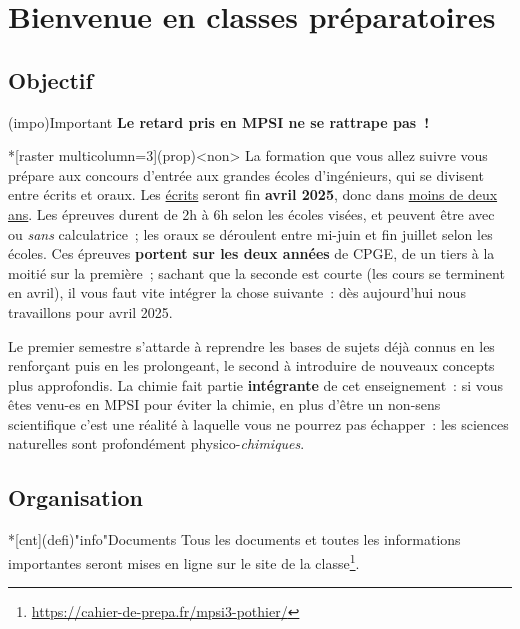 \documentclass[10pt, garamond]{book}
\begin{document}
\chapter*{Bienvenue en classes pr\'eparatoires}

\section{Objectif}

\begin{tcbraster}[raster columns=4, raster equal height=rows]
	\begin{tcb}[width=.5\linewidth, cnt](impo){Important}
		\textbf{Le retard pris en MPSI ne se rattrape pas~!}
	\end{tcb}
	\begin{tcb}*[raster multicolumn=3](prop)<non>{}
		La formation que vous allez suivre vous prépare aux concours d'entrée
		aux grandes écoles d'ingénieurs, qui se divisent entre écrits et oraux.
		Les \underline{écrits} seront fin \textbf{avril 2025}, donc dans
		\underline{moins de deux ans}. Les épreuves durent de 2h à 6h selon les
		écoles visées, et peuvent être avec ou \textit{sans} calculatrice~; les
		oraux se déroulent entre mi-juin et fin juillet selon les écoles. Ces
		épreuves \textbf{portent sur les deux années} de CPGE, de un tiers à la
		moitié sur la première~; sachant que la seconde est courte (les cours se
		terminent en avril), il vous faut vite intégrer la chose suivante~: dès
		aujourd'hui nous travaillons pour avril 2025.
	\end{tcb}
\end{tcbraster}

Le premier semestre s'attarde à reprendre les bases de sujets déjà connus en les
renforçant puis en les prolongeant, le second à introduire de nouveaux concepts
plus approfondis. La chimie fait partie \textbf{intégrante} de cet
enseignement~: si vous êtes venu-es en MPSI pour éviter la chimie, en plus
d'être un non-sens scientifique c'est une réalité à laquelle vous ne pourrez pas
échapper~: les sciences naturelles sont profondément physico-\textit{chimiques}.

\section{Organisation}
\begin{tcb}*[cnt](defi)"info"{Documents}
	Tous les documents et toutes les informations importantes seront mises en
	ligne sur le site de la
	classe\footnote{\url{https://cahier-de-prepa.fr/mpsi3-pothier/}}.
\end{tcb}
\end{document}
